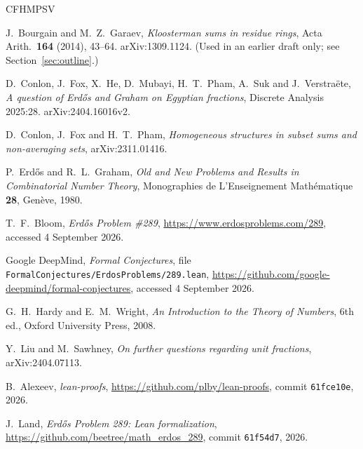 \documentclass[11pt,letterpaper]{article}
\numberwithin{equation}{section}
\theoremstyle{plain}
\theoremstyle{remark}
\begin{document}
\begin{thebibliography}{CFHMPSV}

 J.~Bourgain and M.~Z.~Garaev, \emph{Kloosterman sums in residue rings}, Acta Arith.\ \textbf{164} (2014), 43--64. arXiv:1309.1124. (Used in an earlier draft only; see Section~\ref{sec:outline}.)

 D.~Conlon, J.~Fox, X.~He, D.~Mubayi, H.~T.~Pham, A.~Suk and J.~Verstra\"ete, \emph{A question of Erd\H{o}s and Graham on Egyptian fractions}, Discrete Analysis 2025:28. arXiv:2404.16016v2.

 D.~Conlon, J.~Fox and H.~T.~Pham, \emph{Homogeneous structures in subset sums and non-averaging sets}, arXiv:2311.01416.

 P.~Erd\H{o}s and R.~L.~Graham, \emph{Old and New Problems and Results in Combinatorial Number Theory}, Monographies de L'Enseignement Math\'ematique \textbf{28}, Gen\`eve, 1980.

 T.~F.~Bloom, \emph{Erd\H{o}s Problem \#289}, \url{https://www.erdosproblems.com/289}, accessed 4 September 2026.

 Google DeepMind, \emph{Formal Conjectures}, file \texttt{FormalConjectures/\allowbreak ErdosProblems/\allowbreak 289.lean}, \url{https://github.com/google-deepmind/formal-conjectures}, accessed 4 September 2026.

 G.~H.~Hardy and E.~M.~Wright, \emph{An Introduction to the Theory of Numbers}, 6th ed., Oxford University Press, 2008.

 Y.~Liu and M.~Sawhney, \emph{On further questions regarding unit fractions}, arXiv:2404.07113.

 B.~Alexeev, \emph{lean-proofs}, \url{https://github.com/plby/lean-proofs}, commit \texttt{61fce10e}, 2026.

 J.~Land, \emph{Erd\H{o}s Problem 289: Lean formalization}, \url{https://github.com/beetree/math_erdos_289}, commit \texttt{61f54d7}, 2026.

\end{thebibliography}
\end{document}
